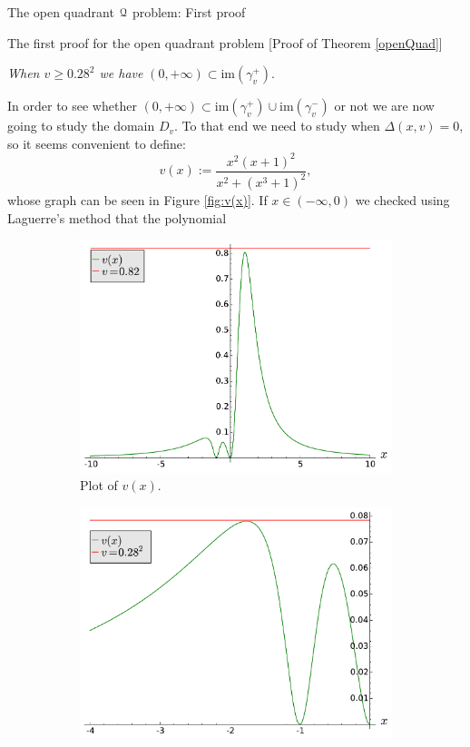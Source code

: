 \documentclass[11pt, a4paper, english, twoside, notitlepage, openright]{report}
\begin{document}
\begin{chapter}{The open quadrant $\mathcal{Q}$ problem: First proof}
\begin{section}{The first proof for the open quadrant problem} [Proof of Theorem \ref{openQuad}]
\begin{center}
 \emph{When $v\geq 0.28^2$ we have} $(0,+\infty)\subset\text{im}(\gamma_v^+)$.
\end{center}\label{step3}
In order to see whether $(0,+\infty)\subset\text{im}(\gamma_v^+)\cup\text{im}(\gamma_v^-)$ or not we are now going to study the domain $D_v$. To that end we need to study when $\Delta(x,v)=0$, so it seems convenient to define:
$$
v(x):=\frac{x^2(x+1)^2}{x^2+(x^3+1)^2},
$$
whose graph can be seen in Figure \ref{fig:v(x)}. If $x\in(-\infty,0)$ we checked using Laguerre's method that the polynomial
\begin{figure}[h]\hspace{-0.2cm}
\begin{subfigure}{.5\linewidth}\centering
\includegraphics[width=1\textwidth]{plots/ch1_10_uve.pdf}
\caption{Plot of $v(x)$.\label{fig:uve}}
\end{subfigure}
\begin{subfigure}{.5\linewidth}\centering
\includegraphics[width=1\textwidth]{plots/ch1_11_uve_detail.pdf}

\end{subfigure}
\end{figure}
\end{section}
\end{chapter}
\end{document}

